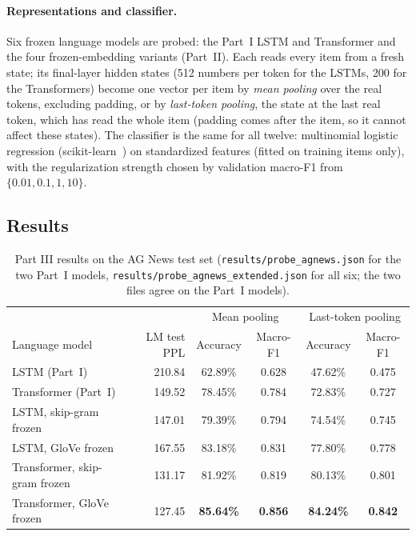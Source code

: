 \documentclass[10pt]{article}
\newcommand{\tok}[1]{\texttt{#1}}
\begin{document}
\paragraph{Representations and classifier.} Six frozen language models are probed: the Part~I LSTM and Transformer and the four frozen-embedding variants (Part~II). Each reads every item from a fresh state; its final-layer hidden states (512 numbers per token for the LSTMs, 200 for the Transformers) become one vector per item by \emph{mean pooling} over the real tokens, excluding padding, or by \emph{last-token pooling}, the state at the last real token, which has read the whole item (padding comes after the item, so it cannot affect these states). The classifier is the same for all twelve: multinomial logistic regression (scikit-learn~\cite{pedregosa2011}) on standardized features (fitted on training items only), with the regularization strength chosen by validation macro-F1 from $\{0.01, 0.1, 1, 10\}$.

\subsection{Results}

\begin{table}[h]
\centering\footnotesize
\begin{tabular}{lrcccc}
\toprule
 & & \multicolumn{2}{c}{Mean pooling} & \multicolumn{2}{c}{Last-token pooling} \\
Language model & LM test PPL & Accuracy & Macro-F1 & Accuracy & Macro-F1 \\
\midrule
LSTM (Part~I) & 210.84 & 62.89\% & 0.628 & 47.62\% & 0.475 \\
Transformer (Part~I) & 149.52 & 78.45\% & 0.784 & 72.83\% & 0.727 \\
LSTM, skip-gram frozen & 147.01 & 79.39\% & 0.794 & 74.54\% & 0.745 \\
LSTM, GloVe frozen & 167.55 & 83.18\% & 0.831 & 77.80\% & 0.778 \\
Transformer, skip-gram frozen & 131.17 & 81.92\% & 0.819 & 80.13\% & 0.801 \\
Transformer, GloVe frozen & 127.45 & \textbf{85.64\%} & \textbf{0.856} & \textbf{84.24\%} & \textbf{0.842} \\
\bottomrule
\end{tabular}
\caption{Part III results on the AG News test set (\tok{results/probe\_agnews.json} for the two Part~I models, \tok{results/probe\_agnews\_extended.json} for all six; the two files agree on the Part~I models).}
\label{tab:part3}
\end{table}
\end{document}
